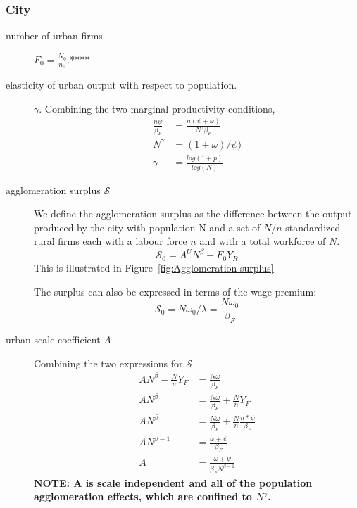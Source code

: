 \subsubsection{City}
\begin{description}

\item[number of urban firms] $F_0=\frac{N_0}{n_0}$.****

\item[elasticity of urban output with respect to population.] $\gamma$. Combining the two marginal productivity conditions, 
\begin{align}
\frac{n\psi}{\beta_F}  &= \frac{n(\psi+\omega)}{N^\gamma \beta_F}  \\
N^\gamma &= (1+\omega)/\psi)\\
\gamma &= \frac{log(1+p)}{log(N)}
\end{align}

\item [agglomeration surplus $\mathcal{S}$] We define the agglomeration surplus as the difference between the output produced by  the city with population N and a set of $N/n$ standardized rural firms each with a labour force $n$ and with a total workforce of $N$. 
\[\mathcal{S_0}=A^U N^\beta-F_0Y_R \] 
This is illustrated in Figure~\ref{fig:Agglomeration-surplus}

The surplus can also be expressed in terms of the wage premium:
\[\mathcal{S_0}=N\omega_0/\lambda=\frac{N\omega_0}{\beta_F}\] 


\item[urban scale coefficient $A$] Combining the two expressions for $\mathcal{S}$
\begin{align*}
 AN^\beta-\frac{N}{n}Y_F    &=\frac{N\omega}{\beta_F}\\ 
 AN^\beta   &=\frac{N\omega}{\beta_F} + \frac{N}{n}Y_F \\
 AN^\beta   &=\frac{N\omega}{\beta_F} + \frac{N}{n}\frac{n*\psi}{\beta_F}\\
AN^{\beta-1}   &=\frac{\omega+\psi}{\beta_F}\\ 
  A&=\frac{\omega+\psi}{\beta_FN^{\beta-1}}
\end{align*}
\textbf{NOTE: A is scale independent and all of the population agglomeration effects, which are confined to $N^\gamma$.}
\end{description}


